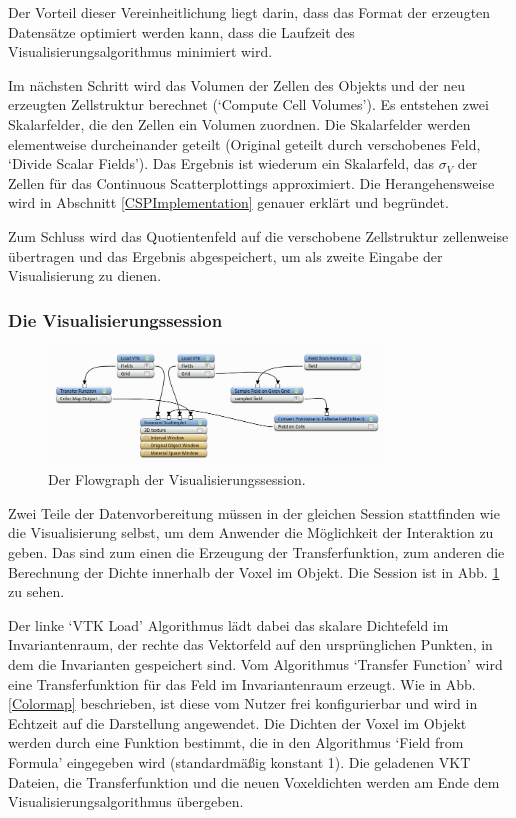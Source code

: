 \documentclass[a4paper,fontsize=12pt,toc=bib,halfparskip]{scrartcl}
\begin{document}
Der Vorteil dieser Vereinheitlichung liegt darin, dass das Format der erzeugten Datens\"atze optimiert werden kann, dass die Laufzeit des Visualisierungsalgorithmus minimiert wird. 

Im n\"achsten Schritt wird das Volumen der Zellen des Objekts und der neu erzeugten Zellstruktur berechnet (`Compute Cell Volumes'). Es entstehen zwei Skalarfelder, die den Zellen ein Volumen zuordnen. Die Skalarfelder werden elementweise durcheinander geteilt (Original geteilt durch verschobenes Feld, `Divide Scalar Fields'). Das Ergebnis ist wiederum ein Skalarfeld, das $\sigma_V$ der Zellen f\"ur das Continuous Scatterplottings approximiert. Die Herangehensweise wird in Abschnitt \ref{CSPImplementation} genauer erkl\"art und begr\"undet.

Zum Schluss wird das Quotientenfeld auf die verschobene Zellstruktur zellenweise \"ubertragen und das Ergebnis abgespeichert, um als zweite Eingabe der Visualisierung zu dienen.

\subsubsection{Die Visualisierungssession}
\begin{figure}
	\centering
	\includegraphics[width=0.8\textwidth]{pictures/VisSession.png}
	\caption{Der Flowgraph der Visualisierungssession.}
	\label{VisualizationSession}
\end{figure}

Zwei Teile der Datenvorbereitung m\"ussen in der gleichen Session stattfinden wie die Visualisierung selbst, um dem Anwender die M\"oglichkeit der Interaktion zu geben. Das sind zum einen die Erzeugung der Transferfunktion, zum anderen die Berechnung der Dichte innerhalb der Voxel im Objekt. Die Session ist in Abb. \ref{VisualizationSession} zu sehen.

Der linke `VTK Load' Algorithmus l\"adt dabei das skalare Dichtefeld im Invariantenraum, der rechte das Vektorfeld auf den urspr\"unglichen Punkten, in dem die Invarianten gespeichert sind. Vom Algorithmus `Transfer Function' wird eine Transferfunktion f\"ur das Feld im Invariantenraum erzeugt. Wie in Abb. \ref{Colormap} beschrieben, ist diese vom Nutzer frei konfigurierbar und wird in Echtzeit auf die Darstellung angewendet. Die Dichten der Voxel im Objekt werden durch eine Funktion bestimmt, die in den Algorithmus `Field from Formula' eingegeben wird (standardm\"a{\ss}ig konstant 1). Die geladenen VKT Dateien, die Transferfunktion und die neuen Voxeldichten werden am Ende dem Visualisierungsalgorithmus \"ubergeben.
\end{document}
